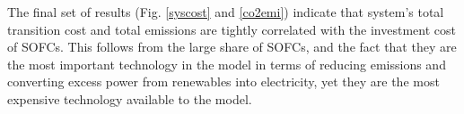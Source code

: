 The final set of results (Fig. \ref{syscost} and \ref{co2emi}) indicate that system's total transition cost and total emissions are tightly correlated with the investment cost of \gls{SOFC}s. This follows from the large share of \gls{SOFC}s, and the fact that they are the most important technology in the model in terms of reducing emissions and converting excess power from renewables into electricity, yet they are the most expensive technology available to the model.